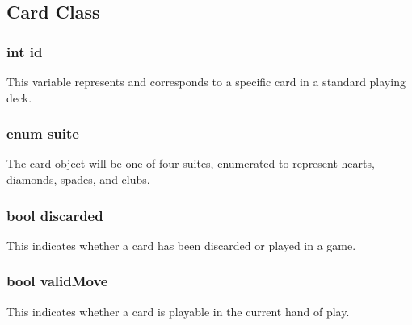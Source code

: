 \subsection{Card Class}

\subsubsection{int id}
	This variable represents and corresponds to a specific card in a standard playing deck.
\subsubsection{enum suite}
	The card object will be one of four suites, enumerated to represent hearts, diamonds, spades, and clubs.
\subsubsection{bool discarded}
	This indicates whether a card has been discarded or played in a game.
\subsubsection{bool validMove}
	This indicates whether a card is playable in the current hand of play.
